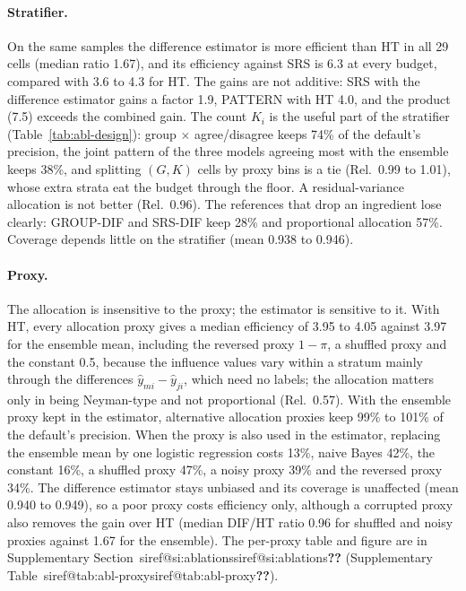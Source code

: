 \documentclass[pdflatex,sn-mathphys-num,iicol]{sn-jnl}
\makeatletter
\theoremstyle{thmstyleone}
\theoremstyle{thmstyletwo}
\theoremstyle{thmstylethree}
\newcommand{\SIref}[1]{\ifcsname siref@#1\endcsname\csname siref@#1\endcsname\else\textbf{??}\fi}
\makeatother
\begin{document}
\paragraph{Stratifier.} On the same samples the difference estimator is more efficient than HT in all 29 cells (median ratio 1.67), and its efficiency against SRS is 6.3 at every budget, compared with 3.6 to 4.3 for HT. The gains are not additive: SRS with the difference estimator gains a factor 1.9, PATTERN with HT 4.0, and the product (7.5) exceeds the combined gain. The count $K_i$ is the useful part of the stratifier (Table~\ref{tab:abl-design}): group $\times$ agree/disagree keeps 74\% of the default's precision, the joint pattern of the three models agreeing most with the ensemble keeps 38\%, and splitting $(G,K)$ cells by proxy bins is a tie (Rel.\ 0.99 to 1.01), whose extra strata eat the budget through the floor. A residual-variance allocation is not better (Rel.\ 0.96). The references that drop an ingredient lose clearly: GROUP-DIF and SRS-DIF keep 28\% and proportional allocation 57\%. Coverage depends little on the stratifier (mean 0.938 to 0.946).

\paragraph{Proxy.} The allocation is insensitive to the proxy; the estimator is sensitive to it. With HT, every allocation proxy gives a median efficiency of 3.95 to 4.05 against 3.97 for the ensemble mean, including the reversed proxy $1-\pi$, a shuffled proxy and the constant 0.5, because the influence values vary within a stratum mainly through the differences $\hat y_{mi}-\hat y_{ji}$, which need no labels; the allocation matters only in being Neyman-type and not proportional (Rel.\ 0.57). With the ensemble proxy kept in the estimator, alternative allocation proxies keep 99\% to 101\% of the default's precision. When the proxy is also used in the estimator, replacing the ensemble mean by one logistic regression costs 13\%, naive Bayes 42\%, the constant 16\%, a shuffled proxy 47\%, a noisy proxy 39\% and the reversed proxy 34\%. The difference estimator stays unbiased and its coverage is unaffected (mean 0.940 to 0.949), so a poor proxy costs efficiency only, although a corrupted proxy also removes the gain over HT (median DIF/HT ratio 0.96 for shuffled and noisy proxies against 1.67 for the ensemble). The per-proxy table and figure are in Supplementary Section~\SIref{si:ablations} (Supplementary Table~\SIref{tab:abl-proxy}).
\end{document}

